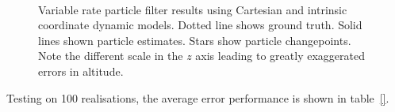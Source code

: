 \documentclass[conference]{IEEEtran}
\begin{document}
\begin{figure}
\centering
{}
\\
\caption{Variable rate particle filter results using Cartesian and intrinsic coordinate dynamic models. Dotted line shows ground truth. Solid lines shown particle estimates. Stars show particle changepoints. Note the different scale in the $z$ axis leading to greatly exaggerated errors in altitude.}
\label{fig:3D_CartesianIntrinsic}
\end{figure}

Testing on 100 realisations, the average error performance is shown in table~\ref{}.
\end{document}
